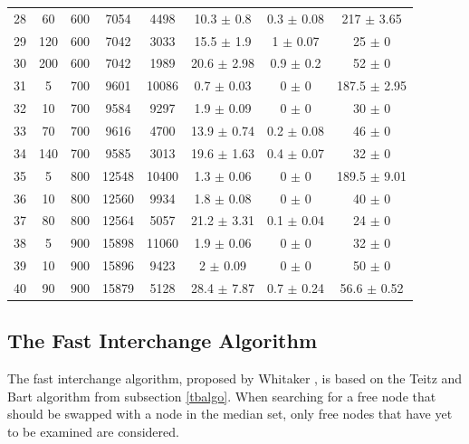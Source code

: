 \documentclass[11pt]{article}
\newcommand{\np}{\newpage}
\begin{document}
\begin{table}[]
{\begin{tabular}{cccccccc}
				28 & 60 & 600 & 7054 & 4498 & 10.3 $\pm$ 0.8 & 0.3 $\pm$ 0.08 & 217 $\pm$ 3.65 \\
				29 & 120 & 600 & 7042 & 3033 & 15.5 $\pm$ 1.9 & 1 $\pm$ 0.07 & 25 $\pm$ 0 \\
				30 & 200 & 600 & 7042 & 1989 & 20.6 $\pm$ 2.98 & 0.9 $\pm$ 0.2 & 52 $\pm$ 0 \\
				\rowcolor[HTML]{EFEFEF} 
				31 & 5 & 700 & 9601 & 10086 & 0.7 $\pm$ 0.03 & 0 $\pm$ 0 & 187.5 $\pm$ 2.95 \\
				\rowcolor[HTML]{EFEFEF} 
				32 & 10 & 700 & 9584 & 9297 & 1.9 $\pm$ 0.09 & 0 $\pm$ 0 & 30 $\pm$ 0 \\
				\rowcolor[HTML]{EFEFEF} 
				33 & 70 & 700 & 9616 & 4700 & 13.9 $\pm$ 0.74 & 0.2 $\pm$ 0.08 & 46 $\pm$ 0 \\
				\rowcolor[HTML]{EFEFEF} 
				34 & 140 & 700 & 9585 & 3013 & 19.6 $\pm$ 1.63 & 0.4 $\pm$ 0.07 & 32 $\pm$ 0 \\
				35 & 5 & 800 & 12548 & 10400 & 1.3 $\pm$ 0.06 & 0 $\pm$ 0 & 189.5 $\pm$ 9.01 \\
				36 & 10 & 800 & 12560 & 9934 & 1.8 $\pm$ 0.08 & 0 $\pm$ 0 & 40 $\pm$ 0 \\
				37 & 80 & 800 & 12564 & 5057 & 21.2 $\pm$ 3.31 & 0.1 $\pm$ 0.04 & 24 $\pm$ 0 \\
				\rowcolor[HTML]{EFEFEF} 
				38 & 5 & 900 & 15898 & 11060 & 1.9 $\pm$ 0.06 & 0 $\pm$ 0 & 32 $\pm$ 0 \\
				\rowcolor[HTML]{EFEFEF} 
				39 & 10 & 900 & 15896 & 9423 & 2 $\pm$ 0.09 & 0 $\pm$ 0 & 50 $\pm$ 0 \\
				\rowcolor[HTML]{EFEFEF} 
				40 & 90 & 900 & 15879 & 5128 & 28.4 $\pm$ 7.87 & 0.7 $\pm$ 0.24 & 56.6 $\pm$ 0.52
			\end{tabular}%
		}
	\end{table}
	
	\np
	
	\subsection{The Fast Interchange Algorithm} \label{fastintalgo}
	The fast interchange algorithm, proposed by Whitaker \cite{WHIT83}, is based on the Teitz and Bart algorithm  from subsection \ref{tbalgo}.  When searching for a free node that should be swapped with a node in the median set, only free nodes that have yet to be examined are considered.
	
\end{document}
